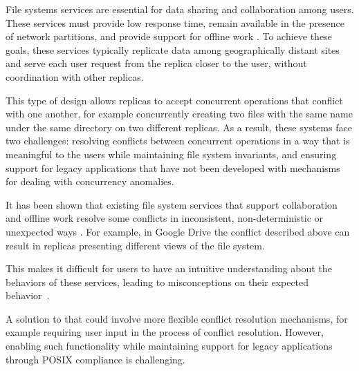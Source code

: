 \documentclass[sigconf, anonymous, 10pt]{acmart}
\begin{document}
File systems services are essential for data sharing and collaboration among users.
These services must provide low response time, remain available in the presence
of network partitions, and provide support for offline work \cite{howard1988scale}.
To achieve these goals, these services typically replicate
data among geographically distant sites and serve each user request from the replica
closer to the user, without coordination with other replicas.

This type of design allows replicas to accept concurrent operations that conflict
with one another, for example concurrently creating two files with the same name
under the same directory on two different replicas.
As a result, these systems face two challenges:
resolving conflicts between concurrent operations in a way that is meaningful to
the users while maintaining file system invariants,
and ensuring support for legacy applications that have not been developed with
mechanisms for dealing with concurrency anomalies.

It has been shown that existing file system services that support collaboration
and offline work resolve some conflicts in inconsistent, non-deterministic or
unexpected ways \cite{cai2018some, taothanh:tel-01673030}.
For example, in Google Drive the conflict described above can result in replicas presenting different views of the file system.

This makes it difficult for users to have an intuitive understanding about
the behaviors of these services,
leading to misconceptions on their expected behavior~\cite{tang2013you}.

A solution to that could involve more flexible conflict resolution mechanisms,
for example requiring user input in the process of conflict resolution.
However, enabling such functionality while maintaining support for legacy applications
through POSIX compliance is challenging.


\end{document}
